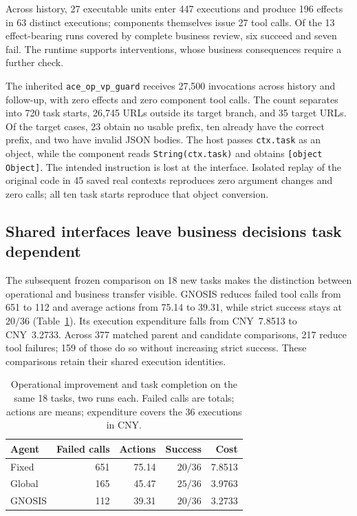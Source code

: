 \documentclass{ecai}
\begin{document}
Across history, 27 executable units enter 447 executions and produce 196 effects in 63 distinct executions; components themselves issue 27 tool calls. Of the 13 effect-bearing runs covered by complete business review, six succeed and seven fail. The runtime supports interventions, whose business consequences require a further check.

The inherited \texttt{ace\_op\_vp\_guard} receives 27,500 invocations across history and follow-up, with zero effects and zero component tool calls. The count separates into 720 task starts, 26,745 URLs outside its target branch, and 35 target URLs. Of the target cases, 23 obtain no usable prefix, ten already have the correct prefix, and two have invalid JSON bodies. The host passes \texttt{ctx.task} as an object, while the component reads \texttt{String(ctx.task)} and obtains \texttt{[object Object]}. The intended instruction is lost at the interface. Isolated replay of the original code in 45 saved real contexts reproduces zero argument changes and zero calls; all ten task starts reproduce that object conversion.

\subsection{Shared interfaces leave business decisions task dependent}

The subsequent frozen comparison on 18 new tasks makes the distinction between operational and business transfer visible. GNOSIS reduces failed tool calls from 651 to 112 and average actions from 75.14 to 39.31, while strict success stays at $20/36$ (Table~\ref{tab:efficiency}). Its execution expenditure falls from CNY~7.8513 to CNY~3.2733. Across 377 matched parent and candidate comparisons, 217 reduce tool failures; 159 of those do so without increasing strict success. These comparisons retain their shared execution identities.

\begin{table}[t]
\centering
\caption{Operational improvement and task completion on the same 18 tasks, two runs each. Failed calls are totals; actions are means; expenditure covers the 36 executions in CNY.}
\label{tab:efficiency}
\footnotesize
\renewcommand{\arraystretch}{1.13}
\begin{tabular*}{\columnwidth}{@{\extracolsep{\fill}}lrrrr@{}}
\toprule
Agent & Failed calls & Actions & Success & Cost\\
\midrule
Fixed & 651 & 75.14 & $20/36$ & 7.8513\\
Global & 165 & 45.47 & $25/36$ & 3.9763\\
GNOSIS & 112 & 39.31 & $20/36$ & 3.2733\\
\bottomrule
\end{tabular*}
\end{table}
\end{document}

